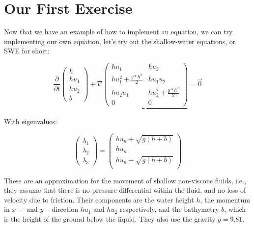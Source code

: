 \documentclass[12pt,letterpaper]{article}
\begin{document}
\section{Our First Exercise}
\vspace{0.2cm}

Now that we have an example of how to implement an equation,
we can try implementing our own equation, let's try out the shallow-water equations, or SWE for short:

\begin{equation*} \label{SWE_wo}
    \frac{\partial}{\partial t}\left(
    \begin{array}{lr} h \\
        h u_1 \\
        h u_2 \\
        b
        \end{array} \right) +
    \nabla \underbrace{\begin{pmatrix}
        h u_1                       & h u_2     \\
        h u_1^2 + \frac{g*h^2}{2}   & h u_1 u_2 \\
        h u_2 u_1                   & h u_2^2  + \frac{g*h^2}{2} \\
        0                           & 0
    \end{pmatrix}} = \vec{0}
\end{equation*}

With eigenvalues:

\begin{equation*}
    \left(
    \begin{array}{lr}
        \lambda_1 \\
        \lambda_2 \\
        \lambda_3
    \end{array} \right) =
    \left(
    \begin{array}{lr}
        h u_n + \sqrt{g (h+b)} \\
        h u_n \\
        h u_n - \sqrt{g (h+b)} \\
    \end{array} \right)
\end{equation*}

These are an approximation for the movement of shallow non-viscous fluids, i.e., they assume that there is no pressure
differential within the fluid, and no loss of velocity due to friction.
Their components are the water height $h$, the momentum in $x-$ and $y-$direction $hu_1$ and $hu_2$ respectively,
and the bathymetry $b$, which is the height of the ground below the liquid. They also use the gravity $g=9.81$.\\
\end{document}
